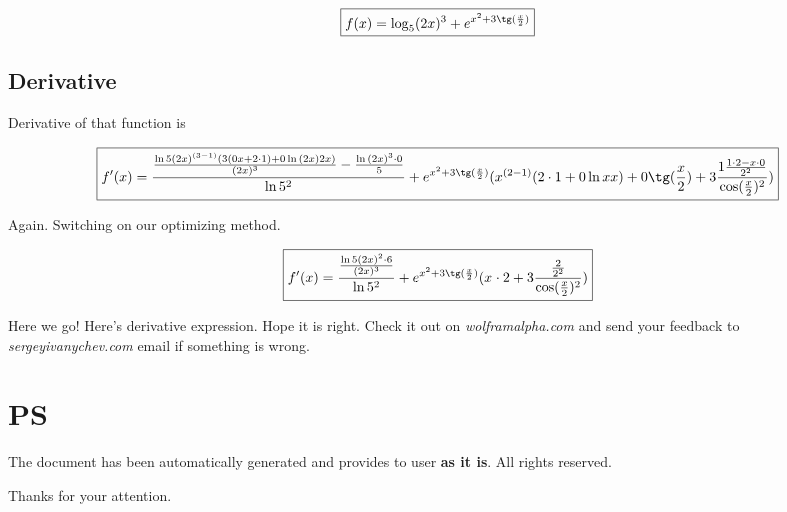 \documentclass[a4paper, 12pt]{report}
\begin{document}
$$
\boxed{
f(x) = 
\log_{5}(2x)^{3} + e^{x^{2} + 3\tg(\frac{x}{2})}
}
$$

\section{Derivative}

Derivative of that function is

$$
\boxed{
f'(x) = 
\frac{\frac{\ln{}5(2x)^{(3 - 1)}(3(0x + 2 \cdot 1) + 0\ln{}(2x)2x)}{(2x)^{3}} - \frac{\ln{}(2x)^{3} \cdot 0}{5}}{\ln{}5^{2}} + e^{x^{2} + 3\tg(\frac{x}{2})}(x^{(2 - 1)}(2 \cdot 1 + 0\ln{}xx) + 0\tg(\frac{x}{2}) + 3\frac{1\frac{1 \cdot 2 - x \cdot 0}{2^{2}}}{\cos(\frac{x}{2})^{2}})
}
$$

Again. Switching on our optimizing method.

$$
\boxed{
f'(x) = 
\frac{\frac{\ln{}5(2x)^{2} \cdot 6}{(2x)^{3}}}{\ln{}5^{2}} + e^{x^{2} + 3\tg(\frac{x}{2})}(x^{} \cdot 2 + 3\frac{\frac{2}{2^{2}}}{\cos(\frac{x}{2})^{2}})
}
$$

Here we go! Here's derivative expression. 
Hope it is right.
Check it out on {\sl{}wolframalpha.com} and send your feedback to {\sl{}sergeyivanychev.com} email if something is wrong.

\chapter{PS}
The document has been automatically generated and provides to user {\bf{}as it is}. All rights reserved.

Thanks for your attention.
\end{document}
